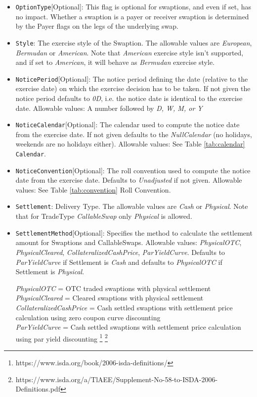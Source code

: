 \begin{itemize}
\item \lstinline!OptionType![Optional]: This flag is optional for swaptions, and even if set, has no impact. Whether a swaption is a payer or receiver swaption is determined by the Payer flags on the legs of the underlying swap.

\item  \lstinline!Style!: The exercise style of the Swaption. The allowable values are \emph{European},  \emph{Bermudan} or  \emph{American}.  Note that  \emph{American} exercise style isn't supported, and if set to  \emph{American}, it will behave as  \emph{Bermudan} exercise style.

\item \lstinline!NoticePeriod![Optional]: The notice period defining the date (relative to the exercise date) on which the exercise
  decision has to be taken. If not given the notice period defaults to \emph{0D}, i.e. the notice date is identical to the
  exercise date. Allowable values: A number followed by \emph{D, W, M, or Y}

\item \lstinline!NoticeCalendar![Optional]: The calendar used to compute the notice date from the exercise date. If not given
  defaults to the \emph{NullCalendar} (no holidays, weekends are no holidays either). Allowable values: See Table \ref{tab:calendar} \lstinline!Calendar!.

\item \lstinline!NoticeConvention![Optional]: The roll convention used to compute the notice date from the exercise date. Defaults to
  \emph{Unadjusted} if not given. Allowable values: See Table \ref{tab:convention} Roll Convention.

\item  \lstinline!Settlement!: Delivery Type. The allowable values are \emph{Cash} or \emph{Physical}. Note that for TradeType \emph{CallableSwap} only \emph{Physical} is allowed.

\item \lstinline!SettlementMethod![Optional]: Specifies the method to calculate the settlement amount for Swaptions and CallableSwaps. Allowable values: \emph{PhysicalOTC}, \emph{PhysicalCleared}, \emph{CollateralizedCashPrice}, \emph{ParYieldCurve}. Defaults to \emph{ParYieldCurve} if Settlement is \emph{Cash} and defaults to \emph{PhysicalOTC} if Settlement is \emph{Physical}.

\emph{PhysicalOTC} = OTC traded swaptions with physical settlement\\
\emph{PhysicalCleared} = Cleared swaptions with physical settlement\\
\emph{CollateralizedCashPrice} = Cash settled swaptions with settlement price calculation using zero coupon curve discounting \\
\emph{ParYieldCurve}  = Cash settled swaptions with settlement price calculation using par yield discounting \footnote{https://www.isda.org/book/2006-isda-definitions/} \footnote{https://www.isda.org/a/TlAEE/Supplement-No-58-to-ISDA-2006-Definitions.pdf} \\


\end{itemize}
